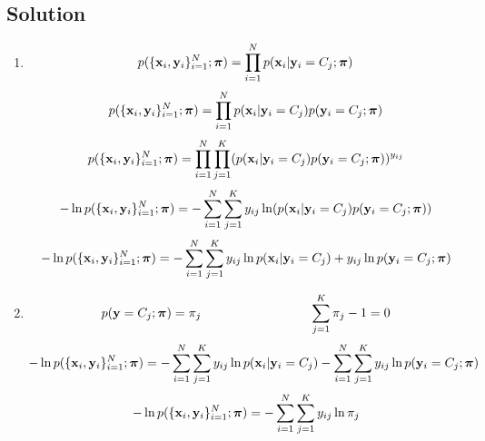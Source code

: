 \documentclass[submit]{harvardml}
\begin{document}
\subsection*{Solution}
    \begin{enumerate}
        \item 
        \begin{equation*}
            p(\{\mathbf{x}_{i}, \mathbf{y}_{i}\}_{i=1}^{N}; \boldsymbol{\pi}) = \prod_{i=1}^{N} p(\mathbf{x}_{i} | \mathbf{y}_{i} = C_j; \boldsymbol{\pi})
        \end{equation*}
        \begin{equation*}
            p(\{\mathbf{x}_{i}, \mathbf{y}_{i}\}_{i=1}^{N}; \boldsymbol{\pi}) = \prod_{i=1}^{N} p(\mathbf{x}_{i} | \mathbf{y}_{i} = C_j)p(\mathbf{y}_{i} = C_j; \boldsymbol{\pi})
        \end{equation*}
        \begin{equation*}
            p(\{\mathbf{x}_{i}, \mathbf{y}_{i}\}_{i=1}^{N}; \boldsymbol{\pi}) = \prod_{i=1}^{N} \prod_{j=1}^{K} (p(\mathbf{x}_{i} | \mathbf{y}_{i} = C_j)p(\mathbf{y}_{i} = C_j; \boldsymbol{\pi}))^{y_{ij}}
        \end{equation*}
        \begin{equation*}
            -\ln p(\{\mathbf{x}_{i}, \mathbf{y}_{i}\}_{i=1}^{N}; \boldsymbol{\pi}) = -\sum_{i=1}^{N} \sum_{j=1}^{K} y_{ij} \ln (p(\mathbf{x}_{i} | \mathbf{y}_{i} = C_j)p(\mathbf{y}_{i} = C_j; \boldsymbol{\pi}))
        \end{equation*}
        \begin{equation*}
            -\ln p(\{\mathbf{x}_{i}, \mathbf{y}_{i}\}_{i=1}^{N}; \boldsymbol{\pi}) = -\sum_{i=1}^{N} \sum_{j=1}^{K} y_{ij} \ln p(\mathbf{x}_{i} | \mathbf{y}_{i} = C_j) + y_{ij} \ln p(\mathbf{y}_{i} = C_j; \boldsymbol{\pi})
        \end{equation*}
        \item
        \begin{equation*}
            p(\boldy = C_j; \bpi) = \pi_{j}
            \hspace{3cm}
            \sum_{j=1}^{K}\pi_j - 1 = 0
        \end{equation*}
        \begin{equation*}
            -\ln p(\{\mathbf{x}_{i}, \mathbf{y}_{i}\}_{i=1}^{N}; \boldsymbol{\pi}) = -\sum_{i=1}^{N} \sum_{j=1}^{K} y_{ij} \ln p(\mathbf{x}_{i} | \mathbf{y}_{i} = C_j) -\sum_{i=1}^{N} \sum_{j=1}^{K} y_{ij}\ln  p(\mathbf{y}_{i} = C_j; \boldsymbol{\pi})
        \end{equation*}
        \begin{equation*}
            -\ln p(\{\mathbf{x}_{i}, \mathbf{y}_{i}\}_{i=1}^{N}; \boldsymbol{\pi}) = -\sum_{i=1}^{N} \sum_{j=1}^{K} y_{ij} \ln \pi_{j}
        \end{equation*}

\end{enumerate}
\end{document}
